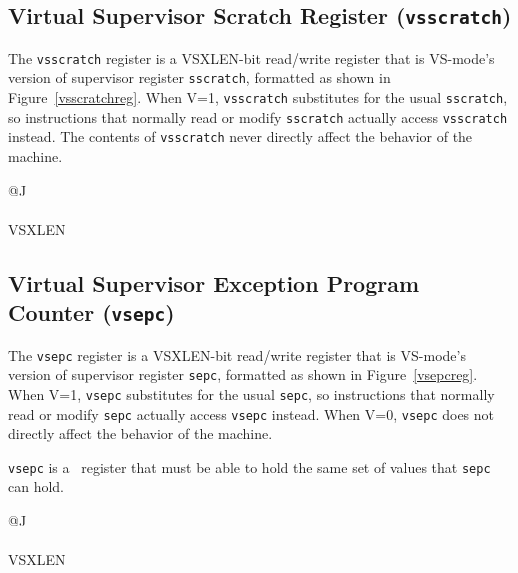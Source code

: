 \subsection{Virtual Supervisor Scratch Register ({\tt vsscratch})}

The {\tt vsscratch} register is a VSXLEN-bit read/write register that is
VS-mode's version of supervisor register {\tt sscratch}, formatted as
shown in Figure~\ref{vsscratchreg}.
When V=1, {\tt vsscratch} substitutes for the usual {\tt sscratch}, so
instructions that normally read or modify {\tt sscratch} actually access
{\tt vsscratch} instead.
The contents of {\tt vsscratch} never directly affect the behavior of
the machine.

\begin{figure*}[h!]
{\footnotesize
\begin{center}
\begin{tabular}{@{}J}
 \\
\hline
{} \\
\hline
VSXLEN \\
\end{tabular}
\end{center}
}
\vspace{-0.1in}
\caption{Virtual supervisor scratch register ({\tt vsscratch}).}
\label{vsscratchreg}
\end{figure*}

\subsection{Virtual Supervisor Exception Program Counter ({\tt vsepc})}

The {\tt vsepc} register is a VSXLEN-bit read/write register that is
VS-mode's version of supervisor register {\tt sepc}, formatted as shown
in Figure~\ref{vsepcreg}.
When V=1, {\tt vsepc} substitutes for the usual {\tt sepc}, so
instructions that normally read or modify {\tt sepc} actually access
{\tt vsepc} instead.
When V=0, {\tt vsepc} does not directly affect the behavior of the
machine.

{\tt vsepc} is a \warl\ register that must be able to hold the same set of
values that {\tt sepc} can hold.

\begin{figure*}[h!]
{\footnotesize
\begin{center}
\begin{tabular}{@{}J}
 \\
\hline
{} \\
\hline
VSXLEN \\
\end{tabular}
\end{center}
}
\vspace{-0.1in}
\caption{Virtual supervisor exception program counter ({\tt vsepc}).}
\label{vsepcreg}
\end{figure*}

